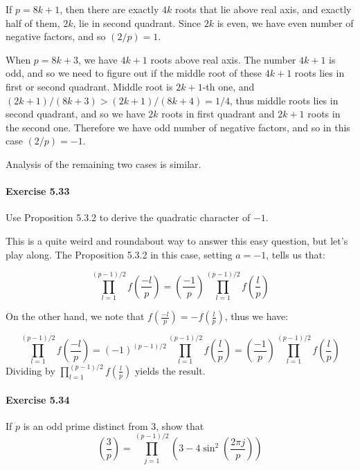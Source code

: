 \documentclass[notitlepage]{article}
\theoremstyle{definition}
\begin{document}
If $p = 8k+1$, then there are exactly $4k$ roots that lie above real
axis, and exactly half of them, $2k$, lie in second quadrant. Since
$2k$ is even, we have even number of negative factors, and so $(2/p) =
1$.

When $p = 8k + 3$, we have $4k+1$ roots above real axis. The number
$4k+1$ is odd, and so we need to figure out if the middle root of
these $4k+1$ roots lies in first or second quadrant. Middle root is
$2k+1$-th one, and $(2k+1)/(8k+3) > (2k+1)/(8k+4) = 1/4$, thus middle
roots lies in second quadrant, and so we have $2k$ roots in first
quadrant and $2k+1$ roots in the second one. Therefore we have odd
number of negative factors, and so in this case $(2/p) = -1$.

Analysis of the remaining two cases is similar.

\paragraph{Exercise 5.33}
Use Proposition 5.3.2 to derive the quadratic character of $-1$.

This is a quite weird and roundabout way to answer this easy question,
but let's play along. The Proposition 5.3.2 in this case, setting $a =
-1$, tells us that:

\begin{equation}
  \prod_{l = 1}^{(p-1)/2} f\left(\frac{-l}{p}\right) =
  \left(\frac{-1}{p}\right) \prod_{l = 1}^{(p-1)/2}
  f\left(\frac{l}{p}\right)
\end{equation}

On the other hand, we note that $f\left(\frac{-l}{p}\right) =
-f\left(\frac{l}{p}\right)$, thus we have:

\begin{equation}
  \prod_{l = 1}^{(p-1)/2} f\left(\frac{-l}{p}\right) = (-1)^{(p-1)/2}
  \prod_{l = 1}^{(p-1)/2} f\left(\frac{l}{p}\right) =
  \left(\frac{-1}{p}\right) \prod_{l = 1}^{(p-1)/2}
  f\left(\frac{l}{p}\right)
\end{equation}
Dividing by $\prod_{l = 1}^{(p-1)/2} f\left(\frac{l}{p}\right)$ yields
the result.

\paragraph{Exercise 5.34}
If $p$ is an odd prime distinct from 3, show that
\begin{equation}
  \left(\frac{3}{p}\right) = \prod_{j=1}^{(p-1)/2} \left(3-4 \sin^2\left(\frac{2 \pi j}{p}\right)\right)
\end{equation}
\end{document}
